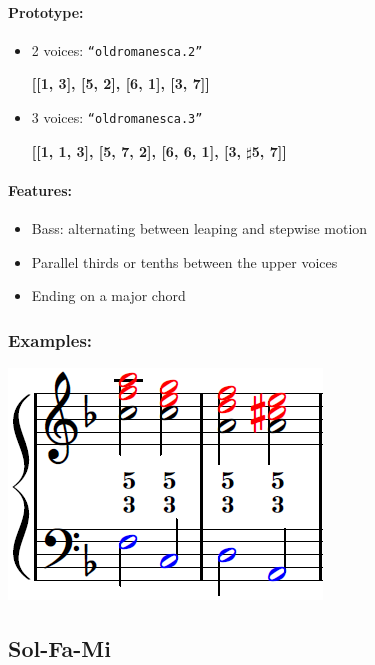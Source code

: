 \documentclass[11pt, openany]{article}
\begin{document}
\paragraph{Prototype:}
\begin{itemize}
\item 2 voices: \texttt{“oldromanesca.2”}
	\begin{center}
	\textbf{[[1, 3], [5, 2], [6, 1], [3, 7]]}
	\end{center}
\item 3 voices: \texttt{“oldromanesca.3”}
	\begin{center}
 	\textbf{[[1, 1, 3], [5, 7, 2], [6, 6, 1], [3, $\sharp$5, 7]]}
 	\end{center}
\end{itemize}

\paragraph{Features:}
\begin{itemize}
\item Bass:  alternating between leaping and stepwise motion
\item Parallel thirds or tenths between the upper voices
\item Ending on a major chord
\end{itemize}

\subsubsection{Examples:}
\begin{center}
\includegraphics[scale=0.8]{oldromanesca.png}
\end{center}


	\subsection{Sol-Fa-Mi}
	
\end{document}
